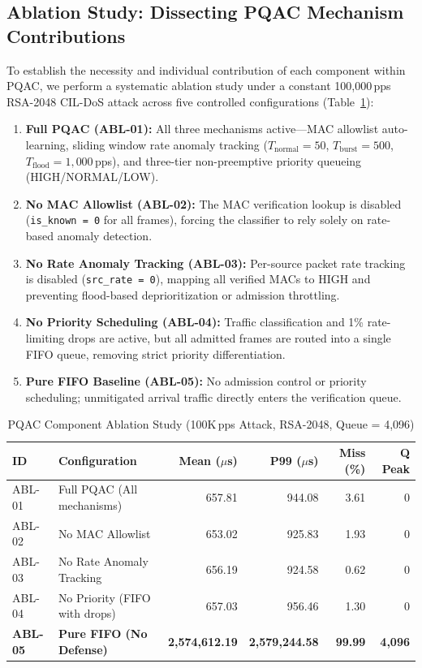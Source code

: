 \documentclass{ieeeaccess}
\begin{document}
\subsection{Ablation Study: Dissecting PQAC Mechanism Contributions}
\label{sec:ablation}
To establish the necessity and individual contribution of each component within PQAC, we perform a systematic ablation study under a constant 100,000\,pps RSA-2048 CIL-DoS attack across five controlled configurations (Table~\ref{tab:ablation_results}):
\begin{enumerate}[leftmargin=*]
    \item \textbf{Full PQAC (ABL-01):} All three mechanisms active---MAC allowlist auto-learning, sliding window rate anomaly tracking ($T_{\text{normal}}=50$, $T_{\text{burst}}=500$, $T_{\text{flood}}=1{,}000$\,pps), and three-tier non-preemptive priority queueing (HIGH/NORMAL/LOW).
    \item \textbf{No MAC Allowlist (ABL-02):} The MAC verification lookup is disabled (\texttt{is\_known = 0} for all frames), forcing the classifier to rely solely on rate-based anomaly detection.
    \item \textbf{No Rate Anomaly Tracking (ABL-03):} Per-source packet rate tracking is disabled (\texttt{src\_rate = 0}), mapping all verified MACs to HIGH and preventing flood-based deprioritization or admission throttling.
    \item \textbf{No Priority Scheduling (ABL-04):} Traffic classification and 1\% rate-limiting drops are active, but all admitted frames are routed into a single FIFO queue, removing strict priority differentiation.
    \item \textbf{Pure FIFO Baseline (ABL-05):} No admission control or priority scheduling; unmitigated arrival traffic directly enters the verification queue.
\end{enumerate}

\begin{table}[t]
\caption{PQAC Component Ablation Study (100K\,pps Attack, RSA-2048, Queue = 4,096)}
\label{tab:ablation_results}
\centering
\small
\begin{tabular}{llrrrr}
\toprule
\textbf{ID} & \textbf{Configuration} & \textbf{Mean ($\mu$s)} & \textbf{P99 ($\mu$s)} & \textbf{Miss (\%)} & \textbf{Q Peak} \\
\midrule
ABL-01 & Full PQAC (All mechanisms) & 657.81 & 944.08 & 3.61 & 0 \\
ABL-02 & No MAC Allowlist & 653.02 & 925.83 & 1.93 & 0 \\
ABL-03 & No Rate Anomaly Tracking & 656.19 & 924.58 & 0.62 & 0 \\
ABL-04 & No Priority (FIFO with drops) & 657.03 & 956.46 & 1.30 & 0 \\
\midrule
\textbf{ABL-05} & \textbf{Pure FIFO (No Defense)} & \textbf{2,574,612.19} & \textbf{2,579,244.58} & \textbf{99.99} & \textbf{4,096} \\
\bottomrule
\end{tabular}
\end{table}
\end{document}

